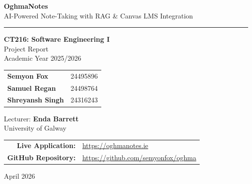 \documentclass[12pt,a4paper]{article}
\begin{document}
\thispagestyle{empty}
\begin{center}
    \vspace*{2cm}

    {\Huge\bfseries\textcolor{oghmablue}{OghmaNotes}}\\[0.5cm]
    {\Large\textcolor{oghmaaccent}{AI-Powered Note-Taking with RAG \& Canvas LMS Integration}}

    \vspace{1.5cm}
    \textcolor{oghmaaccent}{\rule{0.6\textwidth}{1.5pt}}
    \vspace{1.5cm}

    {\Large\textbf{CT216: Software Engineering I}}\\[0.3cm]
    {\large Project Report}\\[0.3cm]
    {\large Academic Year 2025/2026}

    \vspace{2cm}

    \begin{tabular}{ll}
        \textbf{Semyon Fox}      & 24495896 \\
        \textbf{Samuel Regan}    & 24498764 \\
        \textbf{Shreyansh Singh} & 24316243 \\
    \end{tabular}

    \vspace{1.5cm}

    {\large Lecturer: \textbf{Enda Barrett}}\\[0.3cm]
    {\large University of Galway}

    \vspace{1.5cm}

    \begin{tabular}{rl}
        \textbf{Live Application:} & \url{https://oghmanotes.ie} \\
        \textbf{GitHub Repository:} & \url{https://github.com/semyonfox/oghma} \\
    \end{tabular}

    \vfill
    {\large April 2026}
\end{center}
\newpage

\thispagestyle{empty}
\tableofcontents
\newpage
\setcounter{page}{1}

\end{document}
